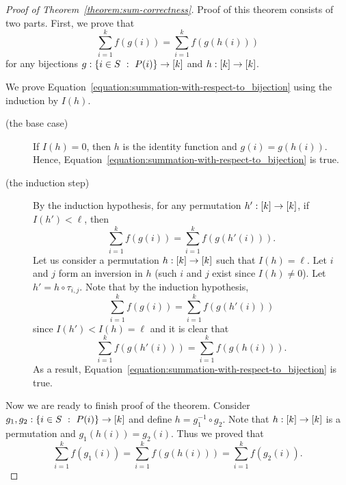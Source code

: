 \begin{proof}[Proof of Theorem~\ref{theorem:sum-correctness}]
    Proof of this theorem consists of two parts.
    First, we prove that
    \begin{equation}
        \label{equation:summation-with-respect-to_bijection}
        \sum_{i = 1}^k f(g(i)) = \sum_{i = 1}^k f(g(h(i)))
    \end{equation}
    for any bijections $g : \set[P(i)]{i \in S} \to \range{k}$ and
    $h : {[{k}]} \to {[{k}]}$.

    We prove Equation~\ref{equation:summation-with-respect-to_bijection} using the
    induction by $I(h)$.
    \begin{description}
        \item[(the base case)] If $I(h) = 0$, then $h$ is the identity function and
            $g(i) = g(h(i))$. Hence,
            Equation~\ref{equation:summation-with-respect-to_bijection} is true.
        \item[(the induction step)] By the induction hypothesis, for any permutation
            $h' : {[{k}]} \to {[{k}]}$,
            if $I(h') < \ell$, then
            \[
                \sum_{i = 1}^k f(g(i)) = \sum_{i = 1}^k f(g(h'(i))).
            \]
            Let us consider a permutation $h : {[{k}]} \to {[{k}]}$ such that
            $I(h) = \ell$. Let $i$ and $j$ form an inversion in $h$ (such $i$ and $j$
            exist since $I(h) \neq 0$). Let $h' = h \circ \tau_{i, j}$.
            Note that by the induction hypothesis,
            \[
                \sum_{i = 1}^k f(g(i)) = \sum_{i = 1}^k f(g(h'(i)))
            \]
            since $I(h') < I(h) = \ell$ and it is clear that
            \[
                \sum_{i = 1}^k f(g(h'(i))) = \sum_{i = 1}^k f(g(h(i))).
            \]
            As a result,
            Equation~\ref{equation:summation-with-respect-to_bijection} is true.
    \end{description}

    Now we are ready to finish proof of the theorem.
    Consider $g_1, g_2 : \set[P(i)]{i \in S} \to \range{k}$ and define
    $h = g_1^{-1} \circ g_2$. Note that $h : {[{k}]} \to {[{k}]}$ is a
    permutation and $g_1(h(i)) = g_2(i)$. Thus we proved that
    \[
        \sum_{i = 1}^k f(g_1(i)) = \sum_{i = 1}^k f(g(h(i))) =
        \sum_{i = 1}^k f(g_2(i)).
    \]
\end{proof}

